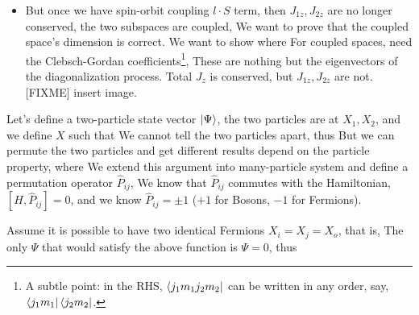 \documentclass{school-22.101-notes}
\begin{document}
\begin{enumerate}
\begin{itemize}
  \item But once we have spin-orbit coupling $l \cdot S$ term, then $J_{1z}, J_{2z}$ are no longer conserved, the two subspaces are coupled, 
    We want to prove that the coupled space's dimension is correct. We want to show 
    where 
    For coupled spaces, need the Clebsch-Gordan coefficients\footnote{A subtle point: in the RHS, $\left< j_1 m_1 j_2 m_2 \right|$ can be written in any order, say, $\left< j_1 m_1 \right| \left< j_2 m_2 \right|$.}, 
    These are nothing but the eigenvectors of the diagonalization process. Total $J_z$ is conserved, but $J_{1z}, J_{2z}$ are not. [FIXME] insert image. 
  \end{itemize}
\end{enumerate}

Let's define a two-particle state vector $\left| \Psi \right>$, the two particles are at $X_1, X_2$, and we define $X$ such that 
We cannot tell the two particles apart, thus 
But we can permute the two particles and get different results depend on the particle property, 
where
We extend this argument into many-particle system and define a permutation operator $\hat{P}_{ij}$, 
We know that $\hat{P}_{ij}$ commutes with the Hamiltonian, $[H, \hat{P}_{ij}] = 0$, and we know $\hat{P}_{ij} = \pm 1$ ($+1$ for Bosons, $-1$ for Fermions). 

Assume it is possible to have two identical Fermions $X_i = X_j = X_o$, that is, 
The only $\Psi$ that would satisfy the above function is $\Psi = 0$, thus  
\end{document}
